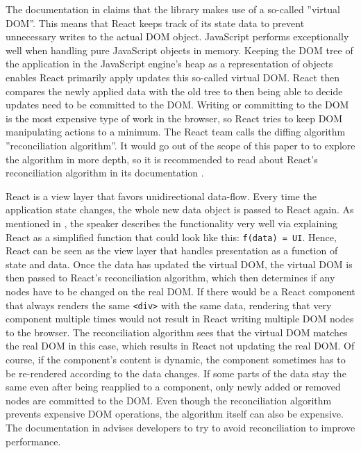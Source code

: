 The documentation in \cite[/docs]{React} claims that the library makes use of a so-called ''virtual DOM''. This means that React keeps track of its state data to prevent unnecessary writes to the actual DOM object. JavaScript performs exceptionally well when handling pure JavaScript objects in memory. Keeping the DOM tree of the application in the JavaScript engine's heap as a representation of objects enables React primarily apply updates this so-called virtual DOM. React then compares the newly applied data with the old tree to then being able to decide updates need to be committed to the DOM. Writing or committing to the DOM is the most expensive type of work in the browser, so React tries to keep DOM manipulating actions to a minimum. The React team calls the diffing algorithm ''reconciliation algorithm''. It would go out of the scope of this paper to to explore the algorithm in more depth, so it is recommended to read about React's reconciliation algorithm in its documentation \cite[/docs]{React}.

React is a view layer that favors unidirectional data-flow. Every time the application state changes, the whole new data object is passed to React again. As mentioned in \cite[6:50]{ReactFoundingVideo}, the speaker describes the functionality very well via explaining React as a simplified function that could look like this: \texttt{f(data) = UI}. Hence, React can be seen as the view layer that handles presentation as a function of state and data. Once the data has updated the virtual DOM, the virtual DOM is then passed to React's reconciliation algorithm, which then determines if any nodes have to be changed on the real DOM. If there would be a React component that always renders the same \texttt{<div>} with the same data, rendering that very component multiple times would not result in React writing multiple DOM nodes to the browser. The reconciliation algorithm sees that the virtual DOM matches the real DOM in this case, which results in React not updating the real DOM. Of course, if the component's content is dynamic, the component sometimes has to be re-rendered according to the data changes. If some parts of the data stay the same even after being reapplied to a component, only newly added or removed nodes are committed to the DOM. Even though the reconciliation algorithm prevents expensive DOM operations, the algorithm itself can also be expensive. The documentation in \cite[/docs/optimizing-performance.html\#avoid-reconciliation]{React} advises developers to try to avoid reconciliation to improve performance.

